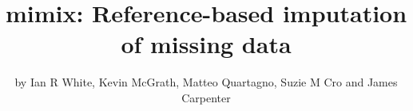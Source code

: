 



\newcommand {\varb}   [1] {{\rm var}\left(#1\right)}
\newcommand {\cov}    [2] {{\rm cov}\left(#1,#2\right)}
\newcommand {\cind}      {\mbox{$\perp\hspace{-0.5em}\perp$}}
\newcommand {\logit}  [1] {{\rm logit}\ #1}
\newcommand {\twovec}[2] {\left( \begin{array}{c} #1 \\ #2 \end{array} \right)}
\newcommand {\N} [2] {N\left(#1,#2\right)}

\newcommand {\pret}{{\le{t}}}
\newcommand {\postt}{{>t}}
\newcommand{\bX}{\boldsymbol{X}}
\newcommand{\bY}{\boldsymbol{Y}}
\newcommand {\tmax}{T} %
\newcommand{\KK}{k_1}



\title{mimix: Reference-based imputation of missing data}
\author{by Ian R White, Kevin McGrath, Matteo Quartagno, Suzie M Cro and James Carpenter}

\maketitle

